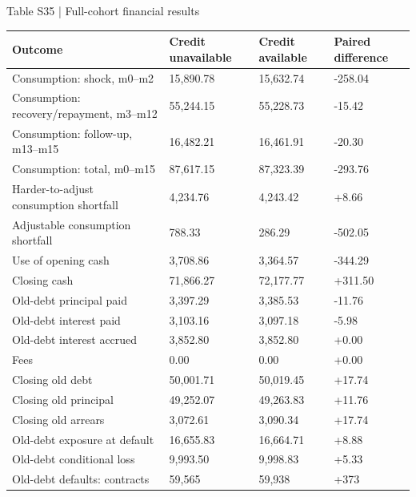 \documentclass[10pt]{article}
\begin{document}
\begin{center}
\begin{minipage}{\textwidth}
\fontsize{8.5}{10.3}\selectfont
Table S35 | Full-cohort financial results
\par\vspace{4pt}
\begin{tabularx}{\textwidth}{@{}XXXX@{}}
\toprule
Outcome & Credit unavailable & Credit available & Paired difference \\
\midrule
Consumption: shock, m0–m2 & 15,890.78 & 15,632.74 & -258.04 \\
Consumption: recovery/repayment, m3–m12 & 55,244.15 & 55,228.73 & -15.42 \\
Consumption: follow-up, m13–m15 & 16,482.21 & 16,461.91 & -20.30 \\
Consumption: total, m0–m15 & 87,617.15 & 87,323.39 & -293.76 \\
Harder-to-adjust consumption shortfall & 4,234.76 & 4,243.42 & +8.66 \\
Adjustable consumption shortfall & 788.33 & 286.29 & -502.05 \\
Use of opening cash & 3,708.86 & 3,364.57 & -344.29 \\
Closing cash & 71,866.27 & 72,177.77 & +311.50 \\
Old-debt principal paid & 3,397.29 & 3,385.53 & -11.76 \\
Old-debt interest paid & 3,103.16 & 3,097.18 & -5.98 \\
Old-debt interest accrued & 3,852.80 & 3,852.80 & +0.00 \\
Fees & 0.00 & 0.00 & +0.00 \\
Closing old debt & 50,001.71 & 50,019.45 & +17.74 \\
Closing old principal & 49,252.07 & 49,263.83 & +11.76 \\
Closing old arrears & 3,072.61 & 3,090.34 & +17.74 \\
Old-debt exposure at default & 16,655.83 & 16,664.71 & +8.88 \\
Old-debt conditional loss & 9,993.50 & 9,998.83 & +5.33 \\
Old-debt defaults: contracts & 59,565 & 59,938 & +373 \\
\bottomrule
\end{tabularx}
\par{}
\end{minipage}
\end{center}
\end{document}

